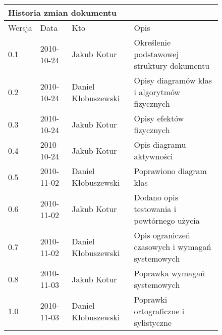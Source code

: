 \begin{figure}[h]
	\centering

\begin{tabular}{|p{}|p{}|p{}|p{}|}
	\hline
	\multicolumn{4}{|l|}{Historia zmian dokumentu} \\
	\hline
	Wersja & Data & Kto & Opis \\
	\hline
	0.1 & 2010-10-24 & Jakub Kotur &
	Określenie podstawowej struktury dokumentu \\
	\hline
	0.2 & 2010-10-24 & Daniel Kłobuszewski &
	Opisy diagramów klas i algorytmów fizycznych \\
	\hline
	0.3 & 2010-10-24 & Jakub Kotur &
	Opisy efektów fizycznych \\
	\hline
	0.4 & 2010-10-24 & Jakub Kotur &
	Opis diagramu aktywności \\
	\hline
	0.5 & 2010-11-02 & Daniel Kłobuszewski &
	Poprawiono diagram klas \\
	\hline
	0.6 & 2010-11-02 & Jakub Kotur &
	Dodano opis testowania i powtórnego użycia \\
	\hline
	0.7 & 2010-11-02 & Daniel Kłobuszewski &
	Opis ograniczeń czasowych i wymagań systemowych \\
	\hline
	0.8 & 2010-11-03 & Jakub Kotur &
	Poprawka wymagań systemowych \\
	\hline
	1.0 & 2010-11-03 & Daniel Kłobuszewski &
	Poprawki ortograficzne i sylistyczne \\
	\hline
\end{tabular}

	\label{tab:metric}
\end{figure}

